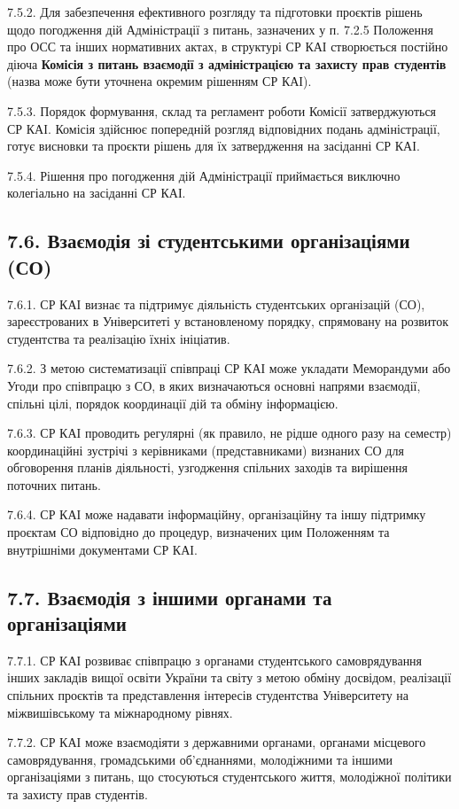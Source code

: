     7.5.2. Для забезпечення ефективного розгляду та підготовки проєктів рішень щодо погодження дій Адміністрації з питань, зазначених у п. 7.2.5 Положення про ОСС та інших нормативних актах, в структурі СР КАІ створюється постійно діюча \textbf{Комісія з питань взаємодії з адміністрацією та захисту прав студентів} (назва може бути уточнена окремим рішенням СР КАІ).

    7.5.3. Порядок формування, склад та регламент роботи Комісії затверджуються СР КАІ. Комісія здійснює попередній розгляд відповідних подань адміністрації, готує висновки та проєкти рішень для їх затвердження на засіданні СР КАІ.

    7.5.4. Рішення про погодження дій Адміністрації приймається виключно колегіально на засіданні СР КАІ.

\subsection*{7.6. Взаємодія зі студентськими організаціями (СО)}
    7.6.1. СР КАІ визнає та підтримує діяльність студентських організацій (СО), зареєстрованих в Університеті у встановленому порядку, спрямовану на розвиток студентства та реалізацію їхніх ініціатив.

    7.6.2. З метою систематизації співпраці СР КАІ може укладати Меморандуми або Угоди про співпрацю з СО, в яких визначаються основні напрями взаємодії, спільні цілі, порядок координації дій та обміну інформацією.

    7.6.3. СР КАІ проводить регулярні (як правило, не рідше одного разу на семестр) координаційні зустрічі з керівниками (представниками) визнаних СО для обговорення планів діяльності, узгодження спільних заходів та вирішення поточних питань.

    7.6.4. СР КАІ може надавати інформаційну, організаційну та іншу підтримку проєктам СО відповідно до процедур, визначених цим Положенням та внутрішніми документами СР КАІ.

\subsection*{7.7. Взаємодія з іншими органами та організаціями}
    7.7.1. СР КАІ розвиває співпрацю з органами студентського самоврядування інших закладів вищої освіти України та світу з метою обміну досвідом, реалізації спільних проєктів та представлення інтересів студентства Університету на міжвишівському та міжнародному рівнях.

    7.7.2. СР КАІ може взаємодіяти з державними органами, органами місцевого самоврядування, громадськими об'єднаннями, молодіжними та іншими організаціями з питань, що стосуються студентського життя, молодіжної політики та захисту прав студентів. 